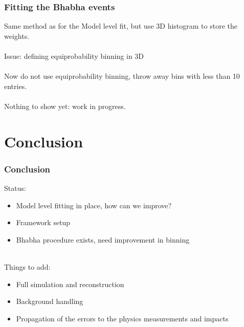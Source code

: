 \documentclass{beamer}
\begin{document}
\begin{frame}
\frametitle{Fitting the Bhabha events}
Same method as for the Model level fit, but use 3D histogram to store the
weights.\\
~\\
Issue: defining equiprobability binning in 3D\\
~\\
Now do not use equiprobability binning, throw away bins with less than 10
entries.\\
~\\
Nothing to show yet: \alert{work in progress}.
\end{frame}



\section{Conclusion}
\begin{frame}
\frametitle{Conclusion}
Status:
\begin{itemize}
  \item Model level fitting in place, how can we improve?
  \item Framework setup
  \item Bhabha procedure exists, need improvement in binning
\end{itemize}
~\\
Things to add:
\begin{itemize}
  \item Full simulation and reconstruction
  \item Background handling
  \item Propagation of the errors to the physics measurements and impacts
\end{itemize}
\end{frame}
\end{document}
